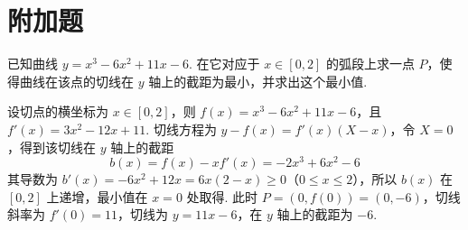 \section{附加题}

\begin{problem}

已知曲线 \(y=x^3-6x^2+11x-6\). 在它对应于 \(x\in\left[0,2\right]\) 的弧段上求一点 \(P\)，使得曲线在该点的切线在 \(y\) 轴上的截距为最小，并求出这个最小值.

\begin{solution}
设切点的横坐标为 \(x\in[0,2]\)，则 \(f(x)=x^3-6x^2+11x-6\)，且 \(f'(x)=3x^2-12x+11\). 切线方程为 \(y-f(x)=f'(x)(X-x)\)，令 \(X=0\)，得到该切线在 \(y\) 轴上的截距
\[
b(x)=f(x)-xf'(x)=-2x^3+6x^2-6
\]
其导数为 \(b'(x)=-6x^2+12x=6x(2-x)\geqslant0\)（\(0\leqslant x\leqslant2\)），所以 \(b(x)\) 在 \([0,2]\) 上递增，最小值在 \(x=0\) 处取得. 此时 \(P=(0,f(0))=(0,-6)\)，切线斜率为 \(f'(0)=11\)，切线为 \(y=11x-6\)，在 \(y\) 轴上的截距为 \(-6\).
\end{solution}
\end{problem}
